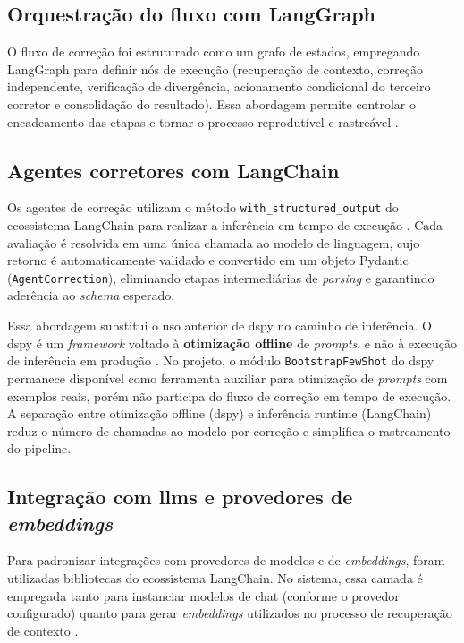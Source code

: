 \subsection{Orquestração do fluxo com LangGraph}
O fluxo de correção foi estruturado como um grafo de estados, empregando LangGraph para definir nós de execução (recuperação de contexto, correção independente, verificação de divergência, acionamento condicional do terceiro corretor e consolidação do resultado). Essa abordagem permite controlar o encadeamento das etapas e tornar o processo reprodutível e rastreável \cite{langgraph_docs_2026}.

\subsection{Agentes corretores com LangChain}
Os agentes de correção utilizam o método \texttt{with\_structured\_output} do ecossistema LangChain para realizar a inferência em tempo de execução \cite{langchain_docs_2026}. Cada avaliação é resolvida em uma única chamada ao modelo de linguagem, cujo retorno é automaticamente validado e convertido em um objeto Pydantic (\texttt{AgentCorrection}), eliminando etapas intermediárias de \textit{parsing} e garantindo aderência ao \textit{schema} esperado.

Essa abordagem substitui o uso anterior de \gls{dspy} no caminho de inferência. O \gls{dspy} é um \textit{framework} voltado à \textbf{otimização offline} de \textit{prompts}, e não à execução de inferência em produção \cite{dspy_docs_2026}. No projeto, o módulo \texttt{BootstrapFewShot} do \gls{dspy} permanece disponível como ferramenta auxiliar para otimização de \textit{prompts} com exemplos reais, porém não participa do fluxo de correção em tempo de execução. A separação entre otimização offline (\gls{dspy}) e inferência runtime (LangChain) reduz o número de chamadas ao modelo por correção e simplifica o rastreamento do pipeline.

\subsection{Integração com \texorpdfstring{\gls{llm}}{LLM}s e provedores de \textit{embeddings}}
Para padronizar integrações com provedores de modelos e de \textit{embeddings}, foram utilizadas bibliotecas do ecossistema LangChain. No sistema, essa camada é empregada tanto para instanciar modelos de chat (conforme o provedor configurado) quanto para gerar \textit{embeddings} utilizados no processo de recuperação de contexto \cite{langchain_docs_2026}.

